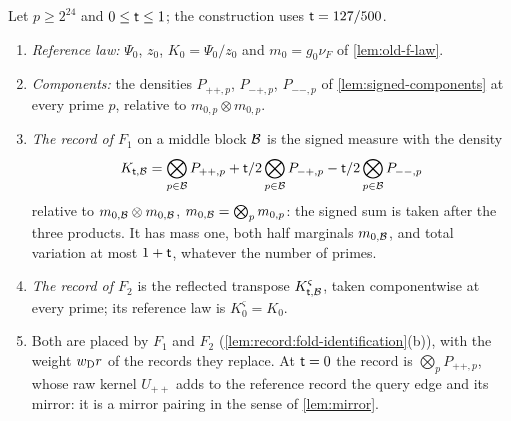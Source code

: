 \begin{definition}\label{def:record:mixture}
Let $p\ge2^{24}$ and $0\le\mathsf t\le1$; the construction uses $\mathsf t=127/500$.
\begin{enumerate}[label=(\alph*)]
\item \emph{Reference law:} $\Psi_0$, $z_0$, $K_0=\Psi_0/z_0$ and $m_0=g_0\nu_F$ of
 \cref{lem:old-f-law}.
\item \emph{Components:} the densities $P_{++,p}$, $P_{-+,p}$, $P_{--,p}$ of
 \cref{lem:signed-components} at every prime $p$, relative to
 $m_{0,p}\otimes m_{0,p}$.
\item \emph{The record of $F_1$} on a middle block $\mathcal B$ is the signed measure
 with the density
 \begin{equation}\label{eq:signed-law}
  K_{\mathsf t,\mathcal B}=\bigotimes_{p\in\mathcal B}P_{++,p}
  +\mathsf t/2\bigotimes_{p\in\mathcal B}P_{-+,p}-\mathsf t/2\bigotimes_{p\in\mathcal B}P_{--,p}
 \end{equation}
 relative to $m_{0,\mathcal B}\otimes m_{0,\mathcal B}$, $m_{0,\mathcal B}=\bigotimes_pm_{0,p}$: the
 signed sum is taken after the three products. It has mass one, both half
 marginals $m_{0,\mathcal B}$, and total variation at most $1+\mathsf t$, whatever the
 number of primes.
\item \emph{The record of $F_2$} is the reflected transpose $K^\varsigma_{\mathsf t,\mathcal B}$,
 taken componentwise at every prime; its reference law is $K_0^\varsigma=K_0$.
\item Both are placed by $F_1$ and $F_2$ (\cref{lem:record:fold-identification}(b)),
 with the weight $w_{\rm D}r$ of the records they replace. At $\mathsf t=0$ the record is
 $\bigotimes_pP_{++,p}$, whose raw kernel $U_{++}$ adds to the reference record
 the query edge and its mirror: it is a mirror pairing in the sense of
 \cref{lem:mirror}.
\end{enumerate}
\end{definition}

